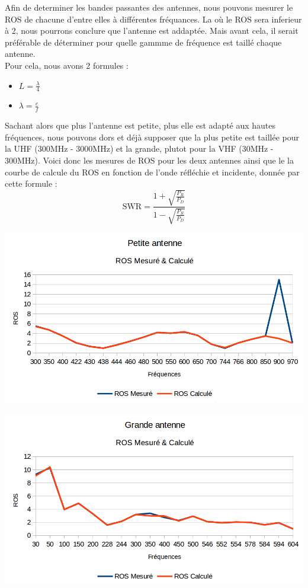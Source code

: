 \documentclass[a4paper,12pt]{report}            %
\begin{document}
Afin de determiner les bandes passantes des antennes, nous pouvons mesurer le ROS de chacune d'entre elles
à différentes fréquances. La où le ROS sera inferieur à 2, nous pourrons conclure que l'antenne est 
addaptée. Mais avant cela, il serait préférable de déterminer pour quelle gammme de fréquence est taillé chaque antenne. \\
Pour cela, nous avons 2 formules :
\begin{itemize}
	\item $L = \frac{\lambda}{4}$
	\item $\lambda = \frac{c}{f}$
\end{itemize}
Sachant alors que plus l'antenne est petite, plus elle est adapté aux hautes fréquences, nous pouvons dors et
déjà supposer que la plus petite est taillée pour la UHF (300MHz - 3000MHz) et la grande, plutot pour la
VHF (30MHz - 300MHz). Voici donc les mesures de ROS pour les deux antennes ainsi que le la courbe de calcule 
du ROS en fonction de l'onde réfléchie et incidente, donnée par cette formule :
$$\mbox{SWR} = \frac{  1+ \sqrt{\frac{P_{R}}{P_{D}}  }   }{1- \sqrt{\frac{P_{R}}{P_{D}}  }}  $$

\begin{center}\includegraphics[scale = 0.5]{pic/ROS_petite_antenne.png}\\ \end{center}
\begin{center}\includegraphics[scale = 0.5]{pic/ROS_grande_antenne.png}\\ \end{center}
\end{document}
